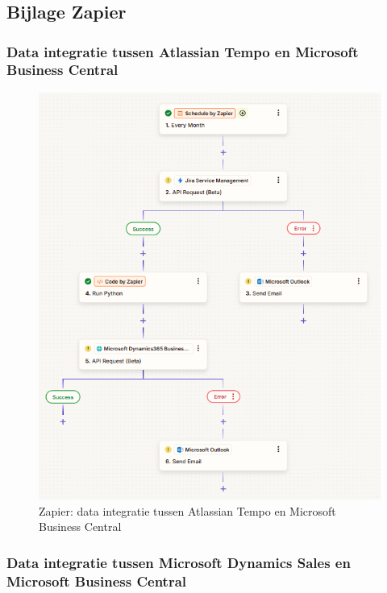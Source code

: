 \chapter{}
\label{ch:bijlage}

\section{Bijlage Zapier}
\label{ch:bijlageZapier}

\subsection{Data integratie tussen Atlassian Tempo en Microsoft Business Central}
\label{ch:Zapier1}

\begin{figure}[H]
    \centering
    \includegraphics[]{../bachproef/images/Zapier_AtlassianTime.png}
    \caption{Zapier: data integratie tussen Atlassian Tempo en Microsoft Business Central}
\end{figure}

\subsection{Data integratie tussen Microsoft Dynamics Sales en Microsoft Business Central}
\label{ch:Zapier2}

